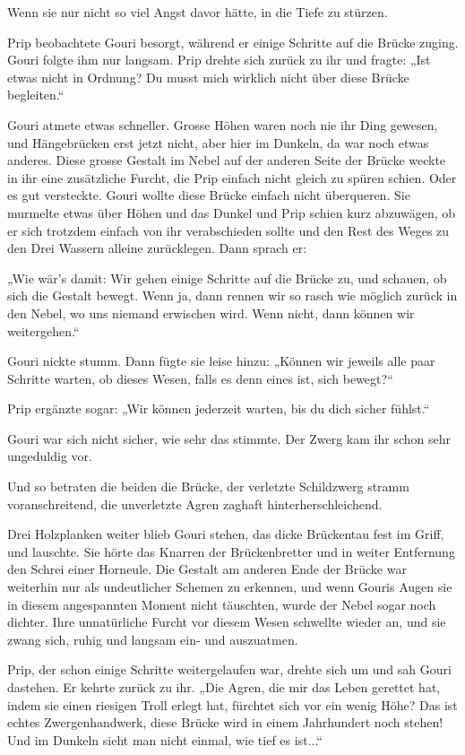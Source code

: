 Wenn sie nur nicht so viel Angst davor hätte, in die Tiefe zu stürzen.

Prip beobachtete Gouri besorgt, während er einige Schritte auf die Brücke zuging. Gouri folgte ihm nur langsam. Prip drehte sich zurück zu ihr und fragte: „Ist etwas nicht in Ordnung? Du musst mich wirklich nicht über diese Brücke begleiten.“

Gouri atmete etwas schneller. Grosse Höhen waren noch nie ihr Ding gewesen, und Hängebrücken erst jetzt nicht, aber hier im Dunkeln, da war noch etwas anderes. Diese grosse Gestalt im Nebel auf der anderen Seite der Brücke weckte in ihr eine zusätzliche Furcht, die Prip einfach nicht gleich zu spüren schien. Oder es gut versteckte. Gouri wollte diese Brücke einfach nicht überqueren. Sie murmelte etwas über Höhen und das Dunkel und Prip schien kurz abzuwägen, ob er sich trotzdem einfach von ihr verabschieden sollte und den Rest des Weges zu den Drei Wassern alleine zurücklegen. Dann sprach er:

„Wie wär’s damit: Wir gehen einige Schritte auf die Brücke zu, und schauen, ob sich die Gestalt bewegt. Wenn ja, dann rennen wir so rasch wie möglich zurück in den Nebel, wo uns niemand erwischen wird. Wenn nicht, dann können wir weitergehen.“

Gouri nickte stumm. Dann fügte sie leise hinzu: „Können wir jeweils alle paar Schritte warten, ob dieses Wesen, falls es denn eines ist, sich bewegt?“

Prip ergänzte sogar: „Wir können jederzeit warten, bis du dich sicher fühlst.“

Gouri war sich nicht sicher, wie sehr das stimmte. Der Zwerg kam ihr schon sehr ungeduldig vor.

Und so betraten die beiden die Brücke, der verletzte Schildzwerg stramm voranschreitend, die unverletzte Agren zaghaft hinterherschleichend.

Drei Holzplanken weiter blieb Gouri stehen, das dicke Brückentau fest im Griff, und lauschte. Sie hörte das Knarren der Brückenbretter und in weiter Entfernung den Schrei einer Horneule. Die Gestalt am anderen Ende der Brücke war weiterhin nur als undeutlicher Schemen zu erkennen, und wenn Gouris Augen sie in diesem angespannten Moment nicht täuschten, wurde der Nebel sogar noch dichter. Ihre unnatürliche Furcht vor diesem Wesen schwellte wieder an, und sie zwang sich, ruhig und langsam ein- und auszuatmen.

Prip, der schon einige Schritte weitergelaufen war, drehte sich um und sah Gouri dastehen. Er kehrte zurück zu ihr. „Die Agren, die mir das Leben gerettet hat, indem sie einen riesigen Troll erlegt hat, fürchtet sich vor ein wenig Höhe? Das ist echtes Zwergenhandwerk, diese Brücke wird in einem Jahrhundert noch stehen! Und im Dunkeln sieht man nicht einmal, wie tief es ist...“

